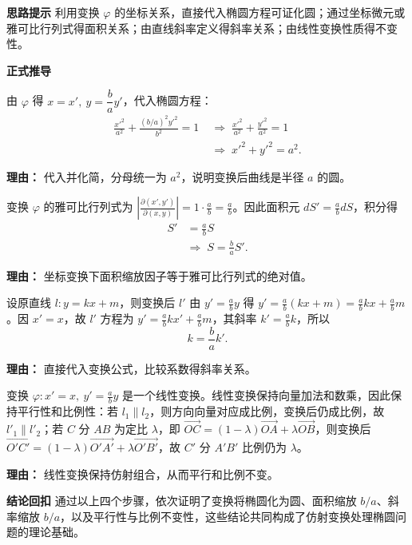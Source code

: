 \begin{proofbox}
	\textbf{\textcolor{CProof}{思路提示}}
	利用变换 $\varphi$ 的坐标关系，直接代入椭圆方程可证化圆；通过坐标微元或雅可比行列式得面积关系；由直线斜率定义得斜率关系；由线性变换性质得不变性。

	\medskip
	\textbf{\textcolor{CProof}{正式推导}}
	\begin{description}[style=nextline, leftmargin=2.8em, labelsep=0.5em, itemsep=0.55em]
		\item[\textbf{步骤一（化圆推导）：}]
			由 $\varphi$ 得 $x=x',\ y=\dfrac{b}{a}y'$，代入椭圆方程：
			\[
				\begin{aligned}
					\frac{x'^2}{a^2}+\frac{(b/a)^2y'^2}{b^2}=1 &\;\Longrightarrow\; \frac{x'^2}{a^2}+\frac{y'^2}{a^2}=1 \\ &\;\Longrightarrow\; x'^2+y'^2=a^2.
			\end{aligned}
			\]
			\par\textbf{理由：} 代入并化简，分母统一为 $a^2$，说明变换后曲线是半径 $a$ 的圆。
		\item[\textbf{步骤二（面积关系）：}]
			变换 $\varphi$ 的雅可比行列式为 $\left|\frac{\partial(x',y')}{\partial(x,y)}\right| = 1 \cdot \frac{a}{b} = \frac{a}{b}$。因此面积元 $dS' = \frac{a}{b} dS$，积分得
			\[
				\begin{aligned}
					S' &= \frac{a}{b} S \\ &\Longrightarrow\; S = \frac{b}{a} S'.
			\end{aligned}
			\]
			\par\textbf{理由：} 坐标变换下面积缩放因子等于雅可比行列式的绝对值。
		\item[\textbf{步骤三（斜率关系）：}]
			设原直线 $l: y=kx+m$，则变换后 $l'$ 由 $y'=\frac{a}{b}y$ 得 $y'=\frac{a}{b}(kx+m)=\frac{a}{b}k x + \frac{a}{b}m$。因 $x'=x$，故 $l'$ 方程为 $y' = \frac{a}{b}k x' + \frac{a}{b}m$，其斜率 $k'=\frac{a}{b}k$，所以
			\[
				k = \frac{b}{a} k'.
			\]
			\par\textbf{理由：} 直接代入变换公式，比较系数得斜率关系。
		\item[\textbf{步骤四（不变性证明）：}]
			变换 $\varphi: x'=x,\ y'=\frac{a}{b}y$ 是一个线性变换。线性变换保持向量加法和数乘，因此保持平行性和比例性：若 $l_1\parallel l_2$，则方向向量对应成比例，变换后仍成比例，故 $l'_1\parallel l'_2$；若 $C$ 分 $AB$ 为定比 $\lambda$，即 $\overrightarrow{OC}=(1-\lambda)\overrightarrow{OA}+\lambda\overrightarrow{OB}$，则变换后 $\overrightarrow{O'C'}=(1-\lambda)\overrightarrow{O'A'}+\lambda\overrightarrow{O'B'}$，故 $C'$ 分 $A'B'$ 比例仍为 $\lambda$。
			\par\textbf{理由：} 线性变换保持仿射组合，从而平行和比例不变。
	\end{description}

	\medskip
	\textbf{\textcolor{CProof}{结论回扣}}
	通过以上四个步骤，依次证明了变换将椭圆化为圆、面积缩放 $b/a$、斜率缩放 $b/a$，以及平行性与比例不变性，这些结论共同构成了仿射变换处理椭圆问题的理论基础。
\end{proofbox}
